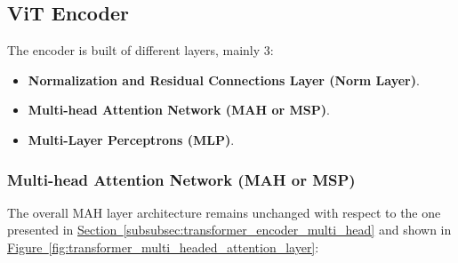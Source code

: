 \documentclass[12pt]{article}
\begin{document}
\subsection{ViT Encoder}
The encoder is built of different layers, mainly 3:
\begin{itemize}
    \item \textbf{Normalization and Residual Connections Layer (Norm Layer)}.
    \item \textbf{Multi-head Attention Network (MAH or MSP)}.
    \item \textbf{Multi-Layer Perceptrons (MLP)}.
\end{itemize}

\subsubsection{Multi-head Attention Network (MAH or MSP)}
The overall MAH layer architecture remains unchanged with respect to the one presented in 
\hyperref[subsubsec:transformer_encoder_multi_head]{Section~\ref*{subsubsec:transformer_encoder_multi_head}}
and shown in \hyperref[fig:transformer_multi_headed_attention_layer]{Figure~\ref*{fig:transformer_multi_headed_attention_layer}}:
\end{document}
